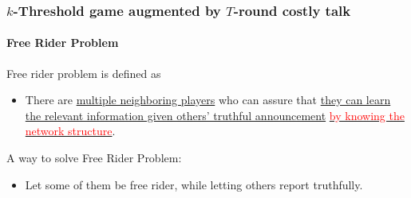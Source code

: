 \documentclass[9pt,handout]{beamer}
\begin{document}
\begin{frame}
  \frametitle{$k$-Threshold game augmented by $T$-round costly talk}
  \framesubtitle{Free Rider Problem}

Free rider problem is defined as 
\begin{itemize}
\item There are \underline{multiple neighboring players} who can assure that \underline{they can learn the relevant information given others' truthful announcement} \underline{\textcolor{red}{by knowing the network structure}}. 
\end{itemize}

A way to solve Free Rider Problem:

\begin{itemize}
\item Let some of them be free rider, while letting others report truthfully.
\end{itemize}


\end{frame}
\end{document}
